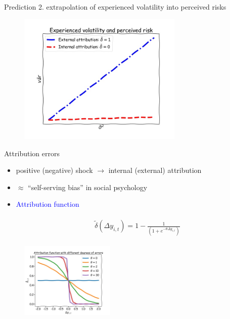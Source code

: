 \documentclass{beamer}
\begin{document}
\begin{frame}{Prediction 2. extrapolation of experienced volatility into perceived risks}
	\begin{figure}
		\centering 
		\label{var_experience_var}
		\includegraphics[width=0.7\textwidth]{figures/var_experience_var.jpg}
	\end{figure}
\end{frame}



\begin{frame}{Attribution errors}
	\begin{itemize}
		\item positive (negative) shock $\rightarrow$ internal (external) attribution
		\item $\approx$ ``self-serving bias'' in social psychology
		\item \textcolor{blue}{Attribution function}
		
		\begin{eqnarray}
		\begin{split}
		\tilde \delta(\Delta y_{i,t}) = 1- \frac{1}{(1+e^{-\theta \Delta y_{i,t}})}
		\end{split}
		\end{eqnarray}
	\end{itemize}

	
	\begin{figure}
		\centering 
		\label{var_experience_var}
		\includegraphics[width=0.4\textwidth]{figures/theta_corr.jpg}
	\end{figure}
\end{frame}
\end{document}
